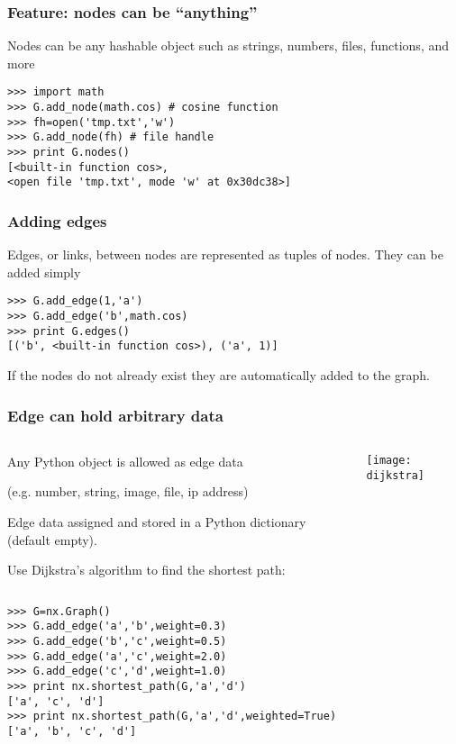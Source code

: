 \documentclass[xcolor=dvipsnames, 9pt]{beamer}
\begin{document}
\begin{frame}[fragile]
\frametitle{Feature: nodes can be ``anything''}

Nodes can be any hashable object such as strings,
numbers, files, functions, and more
\begin{block}{}
\begin{verbatim}
>>> import math
>>> G.add_node(math.cos) # cosine function
>>> fh=open('tmp.txt','w') 
>>> G.add_node(fh) # file handle
>>> print G.nodes()
[<built-in function cos>, 
<open file 'tmp.txt', mode 'w' at 0x30dc38>]
\end{verbatim}
\end{block}


\end{frame}


\begin{frame}[fragile]
\frametitle{Adding edges}
Edges, or links, between nodes are represented as tuples of nodes.  
They can be added simply
\begin{block}{}
\begin{verbatim}
>>> G.add_edge(1,'a')
>>> G.add_edge('b',math.cos)
>>> print G.edges()
[('b', <built-in function cos>), ('a', 1)]
\end{verbatim}
\end{block}

If the nodes do not already exist they are automatically added to the graph.



\end{frame}


\begin{frame}[fragile]
\frametitle{Edge can hold arbitrary data}

\begin{columns}[T]

\begin{column}{0.7\textwidth}
Any Python object is allowed as edge data 

(e.g. number, string, image, file, ip address)

Edge data assigned and stored in a Python dictionary (default empty).

\bigskip
Use Dijkstra's algorithm to find the shortest path:

\end{column}

\begin{column}{0.3\textwidth}
\centerline{\texttt{[image: dijkstra]}}
\end{column}
\end{columns}

\begin{block}{}
\begin{verbatim}
>>> G=nx.Graph()
>>> G.add_edge('a','b',weight=0.3)
>>> G.add_edge('b','c',weight=0.5)
>>> G.add_edge('a','c',weight=2.0)
>>> G.add_edge('c','d',weight=1.0)
>>> print nx.shortest_path(G,'a','d')
['a', 'c', 'd']
>>> print nx.shortest_path(G,'a','d',weighted=True)
['a', 'b', 'c', 'd']
\end{verbatim}
\end{block}

\end{frame}
\end{document}
